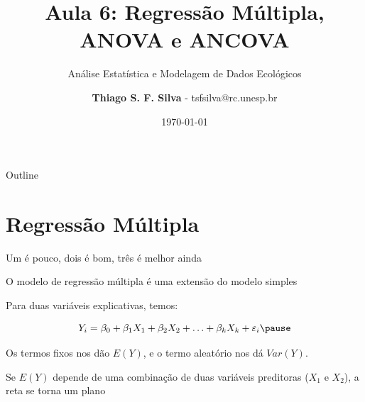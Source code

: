 \documentclass{beamer}\usepackage[]{graphicx}\usepackage[]{color}
\title{Aula 6: Regressão Múltipla, ANOVA e ANCOVA}
\subtitle{Análise Estatística e Modelagem de Dados Ecológicos}
\author{\textbf{Thiago S. F. Silva} - tsfsilva@rc.unesp.br}
\institute{Programa de Pós Graduação em Ecologia e Biodiversidade - UNESP}
\date{\today}
\begin{document}
\begin{frame}[plain] %
  \titlepage
\end{frame}

\begin{frame}{Outline}
  \tableofcontents
\end{frame}

\section{Regressão Múltipla}


\begin{frame}{Um é pouco, dois é bom, três é melhor ainda}

O modelo de regressão múltipla é uma extensão do modelo simples 

\vfill

Para duas variáveis explicativas, temos: \pause

\begin{equation*}
Y_i = \beta _0 + \beta _1 X_1 + \beta _2 X_2 + \ldots + \beta _k X_k + \varepsilon _i \pause
\end{equation*}

Os termos fixos nos dão $E(Y)$, e o termo aleatório nos dá $Var(Y)$. \pause

\vfill

Se $E(Y)$ depende de uma combinação de duas variáveis preditoras ($X_1$ e $X_2$), a reta se torna um plano 

\vfill


\end{frame}
\end{document}
